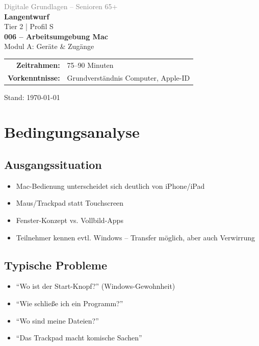 \documentclass[11pt,a4paper]{article}
\begin{document}
\begin{titlepage}
    \centering
    \vspace*{2cm}
    {\Large\textcolor{gray}{Digitale Grundlagen -- Senioren 65+}}\\[2cm]
    {\Huge\textcolor{fach}{\textbf{Langentwurf}}}\\[0.5cm]
    {\large Tier 2 | Profil S}\\[2cm]
    {\LARGE\textbf{006 -- Arbeitsumgebung Mac}}\\[0.5cm]
    {\large Modul A: Geräte \& Zugänge}\\[2cm]
    \begin{tabular}{rl}
        \textbf{Zeitrahmen:} & 75--90 Minuten \\
        \textbf{Vorkenntnisse:} & Grundverständnis Computer, Apple-ID \\
    \end{tabular}
    \vfill
    {\normalsize Stand: \today}
\end{titlepage}

\tableofcontents
\newpage

\section{Bedingungsanalyse}

\subsection{Ausgangssituation}
\begin{itemize}
    \item Mac-Bedienung unterscheidet sich deutlich von iPhone/iPad
    \item Maus/Trackpad statt Touchscreen
    \item Fenster-Konzept vs. Vollbild-Apps
    \item Teilnehmer kennen evtl. Windows -- Transfer möglich, aber auch Verwirrung
\end{itemize}

\subsection{Typische Probleme}
\begin{itemize}
    \item ``Wo ist der Start-Knopf?'' (Windows-Gewohnheit)
    \item ``Wie schließe ich ein Programm?''
    \item ``Wo sind meine Dateien?''
    \item ``Das Trackpad macht komische Sachen''
\end{itemize}
\end{document}
